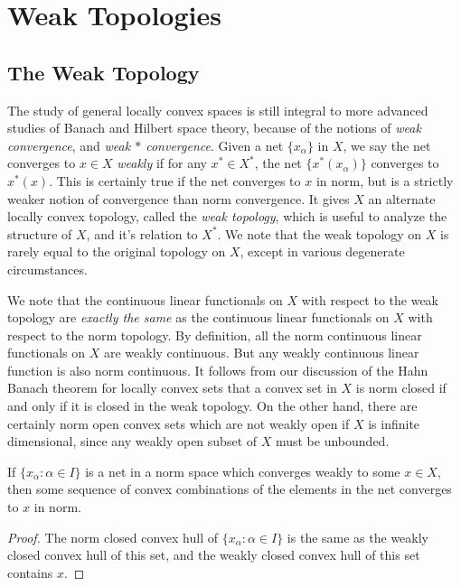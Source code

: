 \chapter{Weak Topologies}

\section{The Weak Topology}

The study of general locally convex spaces is still integral to more advanced studies of Banach and Hilbert space theory, because of the notions of \emph{weak convergence}, and \emph{weak $*$ convergence}. Given a net $\{ x_\alpha \}$ in $X$, we say the net converges to $x \in X$ \emph{weakly} if for any $x^* \in X^*$, the net $\{ x^*(x_\alpha) \}$ converges to $x^*(x)$. This is certainly true if the net converges to $x$ in norm, but is a strictly weaker notion of convergence than norm convergence. It gives $X$ an alternate locally convex topology, called the \emph{weak topology}, which is useful to analyze the structure of $X$, and it's relation to $X^*$. We note that the weak topology on $X$ is rarely equal to the original topology on $X$, except in various degenerate circumstances.

We note that the continuous linear functionals on $X$ with respect to the weak topology are \emph{exactly the same} as the continuous linear functionals on $X$ with respect to the norm topology. By definition, all the norm continuous linear functionals on $X$ are weakly continuous. But any weakly continuous linear function is also norm continuous. It follows from our discussion of the Hahn Banach theorem for locally convex sets that a convex set in $X$ is norm closed if and only if it is closed in the weak topology. On the other hand, there are certainly norm open convex sets which are not weakly open if $X$ is infinite dimensional, since any weakly open subset of $X$ must be unbounded.

\begin{theorem}
    If $\{ x_\alpha : \alpha \in I \}$ is a net in a norm space which converges weakly to some $x \in X$, then some sequence of convex combinations of the elements in the net converges to $x$ in norm.
\end{theorem}
\begin{proof}
    The norm closed convex hull of $\{ x_\alpha : \alpha \in I \}$ is the same as the weakly closed convex hull of this set, and the weakly closed convex hull of this set contains $x$.
\end{proof}

